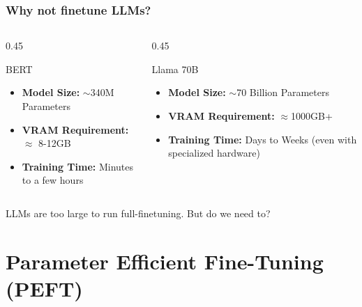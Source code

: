\documentclass[24pt]{beamer}
\begin{document}
    \begin{frame}
    	\frametitle{Why not finetune LLMs?}
    		\begin{columns}
    			
    			\begin{column}{0.45\textwidth}
    				\begin{block}{BERT}
    					\centering
    					\begin{itemize}
    						\item \textbf{Model Size:} $\sim$340M Parameters 
    						\item \textbf{VRAM Requirement:} $\approx$ 8-12GB
    						\item \textbf{Training Time:} Minutes to a few hours
    					\end{itemize}
    				\end{block}
    			\end{column}
    		
	    		\begin{column}{0.45\textwidth}
	    			\begin{block}{Llama 70B}
	    				\centering
	    				\begin{itemize}
	    					\item \textbf{Model Size:} $\sim$70 Billion Parameters
	    					\item \textbf{VRAM Requirement:} $\approx$1000GB+
	    					\item \textbf{Training Time:} Days to Weeks (even with specialized hardware)
	    				\end{itemize}
	    			\end{block}
	    		\end{column}
    	\end{columns}
    	
    	\begin{center}
    		LLMs are \alert{too large} to run full-finetuning. But do we need to?
    	\end{center} 
    \end{frame}


    \section{Parameter Efficient Fine-Tuning (PEFT)}
    
\end{document}
